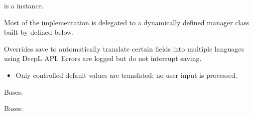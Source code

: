 \documentclass[letterpaper,10pt,english]{sphinxmanual}
\begin{document}
\begin{fulllineitems}
\begin{fulllineitems}
\sphinxAtStartPar
{} is a  instance.

\sphinxAtStartPar
Most of the implementation is delegated to a dynamically defined manager
class built by  defined below.

\end{fulllineitems}


\begin{fulllineitems}
\label{\detokenize{index:core.models.FoodInfo.save}}
\pysigstartsignatures
\pysiglinewithargsret
{}
{\sphinxparamcomma {}}
{}
\pysigstopsignatures
\sphinxAtStartPar
Overrides save to automatically translate certain fields into multiple languages
using DeepL API. Errors are logged but do not interrupt saving.
\begin{description}
\begin{itemize}
\item {} 
\sphinxAtStartPar
Only controlled default values are translated; no user input is processed.

\end{itemize}

\end{description}

\end{fulllineitems}


\begin{fulllineitems}
\label{\detokenize{index:core.models.FoodInfo.DoesNotExist}}
\pysigstartsignatures
\pysigline
{}
\pysigstopsignatures
\sphinxAtStartPar
Bases: 

\end{fulllineitems}


\begin{fulllineitems}
\label{\detokenize{index:core.models.FoodInfo.MultipleObjectsReturned}}
\pysigstartsignatures
\pysigline
{}
\pysigstopsignatures
\sphinxAtStartPar
Bases: 


\end{fulllineitems}
\end{fulllineitems}
\end{document}

